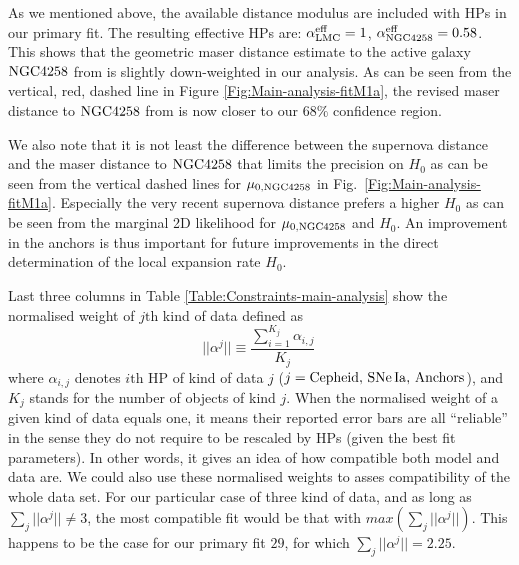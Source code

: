As we mentioned above, the available distance modulus are included with HPs in our primary fit. The resulting effective HPs are: $\alpha^{\mathrm{eff}}_{\mathrm{LMC}}=1$, $\alpha^{\mathrm{eff}}_{\mathrm{NGC4258}}=0.58$. This shows that the geometric maser distance estimate to the active galaxy $\mathrm{NGC4258}$ from \cite{Humphreys:2013eja} is slightly down-weighted in our analysis.  As can be seen from the vertical, red, dashed line in Figure \ref{Fig:Main-analysis-fitM1a}, the revised maser distance to $\mathrm{NGC4258}$  from \cite{Riess:2016jrr} is now closer to our $68\%$ confidence region.     

We also note that it is not least the difference between the supernova distance \cite{Polshaw:2015ika} and
the maser distance \cite{Humphreys:2013eja} to $\mathrm{NGC4258}$ that limits the precision on $H_0$ as can be seen from the vertical dashed lines
for $\mu_{0,\mathrm{NGC4258}}$ in Fig.\ \ref{Fig:Main-analysis-fitM1a}. Especially the very recent supernova distance prefers a higher $H_0$ as can be seen
from the marginal 2D likelihood for $\mu_{0,\mathrm{NGC4258}}$ and $H_0$. An improvement in the anchors is thus important for future improvements in the
direct determination of the local expansion rate $H_0$. %

Last three columns in Table \ref{Table:Constraints-main-analysis} show the normalised weight of $j\mathrm{th}$ kind of data  defined as 
\begin{equation}
|| \alpha^{j} || \equiv \frac{\sum_{i=1}^{K_j} \alpha_{i,j}}{K_j}\,
\label{Eq:normalised-weights}
\end{equation} 
where $\alpha_{i,j}$ denotes $i\mathrm{th}$ HP of kind of data $j$ ($j=\mathrm{Cepheid},\,\mathrm{SNe\,Ia},\,\mathrm{Anchors}$), and $K_j$ stands for the number of objects of kind $j$. When the normalised weight of a given kind of data equals one, it means their reported error bars are all ``reliable'' in the sense they do not require to be rescaled by HPs (given the best fit parameters). In other words, it gives an idea of how compatible both model and data are. We could also use these normalised weights to asses compatibility of the whole data set. For our particular case of three kind of data, and as long as $\sum_j|| \alpha^{j} ||\neq 3$, the most compatible fit would be that with $max(\sum_j|| \alpha^{j} ||)$. This happens to be the case for our primary fit $29$, for which  $\sum_j|| \alpha^{j}||=2.25$. 

